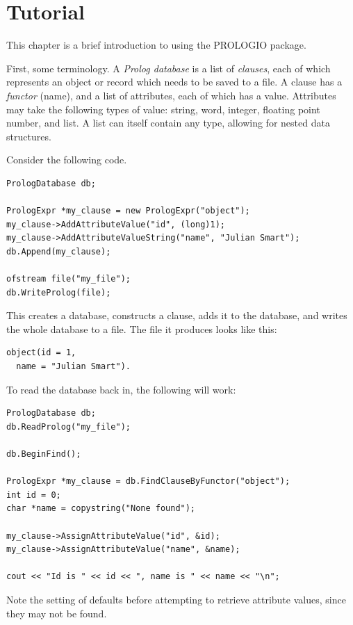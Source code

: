 \chapter{Tutorial}

This chapter is a brief introduction to using the PROLOGIO package.

First, some terminology.  A {\it Prolog database}\/ is a list of {\it clauses},
each of which represents an object or record which needs to be saved to a file.
A clause has a {\it functor}\/ (name), and a list of attributes, each of which
has a value.  Attributes may take the following types of value: string, word,
integer, floating point number, and list.  A list can itself contain any
type, allowing for nested data structures.

Consider the following code.

\begin{verbatim}
PrologDatabase db;

PrologExpr *my_clause = new PrologExpr("object");
my_clause->AddAttributeValue("id", (long)1);
my_clause->AddAttributeValueString("name", "Julian Smart");
db.Append(my_clause);

ofstream file("my_file");
db.WriteProlog(file);
\end{verbatim}

This creates a database, constructs a clause, adds it to the database,
and writes the whole database to a file.  The file it produces looks like
this:

\begin{verbatim}
object(id = 1,
  name = "Julian Smart").
\end{verbatim}

To read the database back in, the following will work:

\begin{verbatim}
PrologDatabase db;
db.ReadProlog("my_file");

db.BeginFind();

PrologExpr *my_clause = db.FindClauseByFunctor("object");
int id = 0;
char *name = copystring("None found");

my_clause->AssignAttributeValue("id", &id);
my_clause->AssignAttributeValue("name", &name);

cout << "Id is " << id << ", name is " << name << "\n";
\end{verbatim}

Note the setting of defaults before attempting to retrieve attribute values,
since they may not be found.
